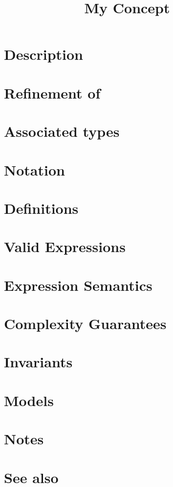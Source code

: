 \documentclass{article}
\begin{document}
\title{My Concept}
\maketitle

\section*{Description}
\section*{Refinement of}
\section*{Associated types}
\section*{Notation}
\section*{Definitions}
\section*{Valid Expressions}
\section*{Expression Semantics}
\section*{Complexity Guarantees}
\section*{Invariants}
\section*{Models}
\section*{Notes}
\section*{See also}



\end{document}
